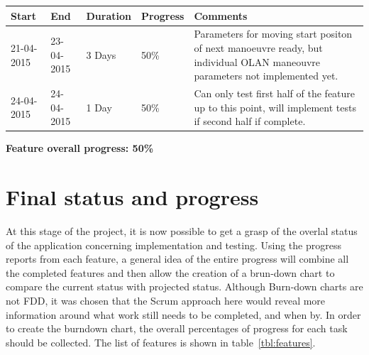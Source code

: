 \begin{table}[h]
\begin{tabular}{|l|l|l|l|p{7cm}|}
\hline
\textbf{Start} & \textbf{End} & \textbf{Duration} & \textbf{Progress} & \textbf{Comments}                                                                                                     \\ \hline
21-04-2015     & 23-04-2015   & 3 Days            & 50\%             &  Parameters for moving start positon of next manoeuvre ready, but individual OLAN maneouvre parameters not implemented yet.\\ \hline
24-04-2015     & 24-04-2015   & 1 Day            & 50\%             &  Can only test first half of the feature up to this point, will implement tests if second half if complete.\\ \hline
\end{tabular}
\end{table}

\textbf{Feature overall progress: 50\%}

\section{Final status and progress}
At this stage of the project, it is now possible to get a grasp of the overlal status of the application concerning implementation and testing. Using the progress reports from each feature, a general idea of the entire progress will combine all the completed features and then allow the creation of a brun-down chart to compare the current status with projected status. Although Burn-down charts are not FDD, it was chosen that the Scrum approach here would reveal more information around what work still needs to be completed, and when by. In order to create the burndown chart, the overall percentages of progress for each task should be collected. The list of features is shown in table~\ref{tbl:features}.

